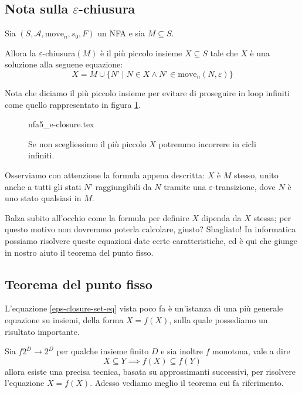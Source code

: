 \documentclass[class=book, crop=false, oneside, 12pt]{standalone}
\begin{document}
\subsection{Nota sulla \(\varepsilon\)-chiusura}
\begin{theorem}
    Sia \((S, \mathcal{A}, \textrm{move}_n, s_0, F)\) un NFA e sia \(M \subseteq S\).
    
    Allora la \(\varepsilon\)-chiusura\((M)\) è il più piccolo insieme \(X \subseteq S\) tale che \(X\) è una soluzione alla seguene equazione:
    \begin{equation}
        X = M \cup \{ N’ \mid N \in X \land N’ \in \textrm{move}_n (N,\varepsilon)\}
        \label{eps-closure-set-eq}
    \end{equation}
\end{theorem}

\noindent Nota che diciamo il più piccolo insieme per evitare di proseguire in loop infiniti come quello rappresentato in figura \ref{nfa_ciclico}.

\begin{figure}
    \centering
    {nfa5_e-closure.tex}
    \caption{Se non scegliessimo il più piccolo \(X\) potremmo incorrere in cicli infiniti.}
    \label{nfa_ciclico}
\end{figure}

Osserviamo con attenzione la formula appena descritta: \(X\) è \(M\) stesso, unito anche a tutti gli stati \(N’\) raggiungibili da \(N\) tramite una \(\varepsilon\)-transizione, dove \(N\) è uno stato qualsiasi in \(M\).

Balza subito all'occhio come la formula per definire \(X\) dipenda da \(X\) stessa; per questo motivo non dovremmo poterla calcolare, giusto? 
Sbagliato! In informatica possiamo risolvere queste equazioni date certe caratteristiche, ed è qui che giunge in nostro aiuto il teorema del punto fisso. 


\subsection{Teorema del punto fisso}
L'equazione \ref{eps-closure-set-eq} vista poco fa è un'istanza di una più generale equazione su insiemi, della forma \(X = f(X)\), sulla quale possediamo un risultato importante.


Sia \(f 2^D \to 2^D\) per qualche insieme finito \(D\) e sia inoltre \( f \) monotona, vale a dire
\begin{equation*}
    X \subseteq Y \implies f(X) \subseteq f(Y)
\end{equation*}
allora esiste una precisa tecnica, basata su approssimanti successivi, per risolvere l'equazione \(X = f(X)\). Adesso vediamo meglio il teorema cui fa riferimento.
\end{document}
